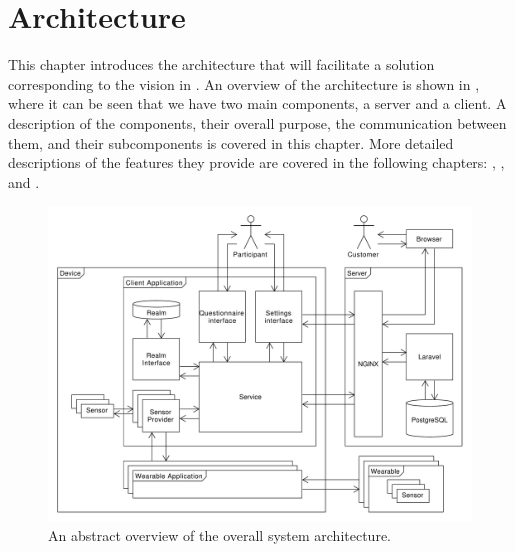 
\chapter{Architecture}
\label{cha:architecture}

This chapter introduces the architecture that will facilitate a solution corresponding to the vision in . An overview of the architecture is shown in , where it can be seen that we have two main components, a server and a client. A description of the components, their overall purpose, the communication between them, and their subcomponents is covered in this chapter. More detailed descriptions of the features they provide are covered in the following chapters: , , and . 

\begin{figure}[!htbp]
    \centering
    \includegraphics[width=\textwidth]{graphic/architecture/architecture.pdf}
    \caption{An abstract overview of the overall system architecture.}
    \label{fig:system_architecture}
\end{figure}
\FloatBarrier


